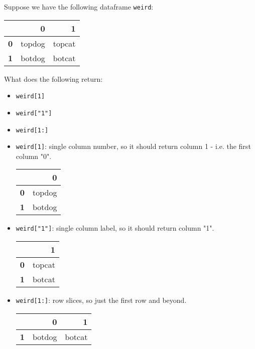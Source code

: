 \begin{example}[]{Suppose we have the following dataframe \texttt{weird}:
\begin{center}
\begin{tabular}{@{}crr@{}}
     & \textbf{0} & \textbf{1} \\
\midrule
    \textbf{0} & topdog & topcat \\
    \rowcolor[gray]{0.85}\textbf{1} & botdog & botcat \\
\end{tabular}
\end{center}
What does the following return:
\begin{itemize}
\item \texttt{weird[1]}
\item \texttt{weird["1"]}
\item \texttt{weird[1:]}
\end{itemize}
\tcbline
\begin{itemize}
\item \texttt{weird[1]}: single column number, so it should return column 1 - i.e. the first column "0".
\begin{center}
\begin{tabular}{@{}cr@{}}
      & \textbf{0} \\
\midrule
    \textbf{0} & topdog \\
    \rowcolor[gray]{0.85} \textbf{1} & botdog \\
\end{tabular}
\end{center}

\item \texttt{weird["1"]}: single column label, so it should return column "1".
\begin{center}
\begin{tabular}{@{}cr@{}}
      & \textbf{1} \\
\midrule
    \textbf{0} & topcat \\
    \rowcolor[gray]{0.85} \textbf{1} & botcat \\
\end{tabular}
\end{center}

\item \texttt{weird[1:]}: row slices, so just the first row and beyond.
\begin{center}
\begin{tabular}{@{}crr@{}}
     & \textbf{0} & \textbf{1} \\
\midrule
    \textbf{1} & botdog & botcat \\
\end{tabular}
\end{center}

\end{itemize}
}
\end{example}
